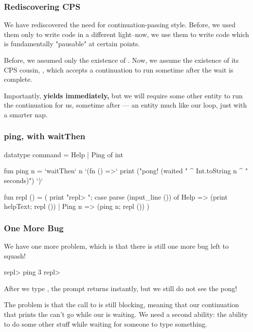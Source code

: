 \documentclass[aspectratio=169]{beamer}
\begin{document}
\begin{frame}[fragile]
  \frametitle{Rediscovering CPS}

  We have rediscovered the need for continuation-passing style. Before,
  we used them only to write code in a different light--now, we use them
  to write code which is fundamentally "pausable" at certain points.

  \pause
  \vspace{\fill}

  Before, we assumed only the existence of . Now,
  we assume the existence of its CPS cousin, ,
  which accepts a continuation to run sometime after the wait is complete.

  \pause
  \vspace{\fill}

  Importantly,  \textbf{yields immediately,} but we will require
  some other entity to run the continuation for us, sometime after ---
  an entity much like our  loop, just with a smarter nap.
\end{frame}

\begin{frame}[fragile]
  \frametitle{ping, with waitThen}

  {\small
  \begin{codeblock}
    datatype command = Help | Ping of int

    fun ping n =
      `waitThen` n `(fn () =>`
        print ("pong! (waited " ^ Int.toString n ^ " seconds)")
      `)`

    fun repl () =
      ( print "repl> ";
        case parse (input_line ()) of
          Help => (print helpText; repl ())
        | Ping n => (ping n; repl ())
      )
\end{codeblock}
  }
\end{frame}

\begin{frame}[fragile]
  \frametitle{One More Bug}

  We have one more problem, which is that there is still one more
  bug left to squash!

  \pause
  \vspace{\fill}

  \begin{codeblock}[language={}]
    repl> ping 3
    repl>
\end{codeblock}

  \pause
  \vspace{\fill}

  After we type , the prompt returns instantly, but we
  still do not see the pong!

  \pause
  \vspace{\fill}

  The problem is that the call to  is still blocking,
  meaning that our continuation that prints the  can't go
  while our  is waiting. We need a second ability: the
  ability to do some other stuff while waiting for someone to type
  something.
\end{frame}
\end{document}
